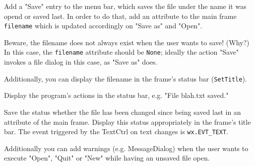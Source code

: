 \begin{aufgabe}
\begin{teilaufgabe}[Save]
Add a "Save" entry to the menu bar, which saves the file under the name it was opend or saved last. In order to do that, add an attribute to the main frame  \lstinline{filename} which is updated accordingly on "Save as" and "Open".

Beware, the filename does not always exist when the user wants to save! (Why?) In this case, the \lstinline{filename} attribute should be \lstinline{None}; ideally the action "Save" invokes a file dialog in this case, as "Save as" does.

Additionally, you can display the filename in the frame's status bar (\lstinline{SetTitle}).
\end{teilaufgabe}

\begin{teilaufgabe}
Display the program's actions in the status bar, e.g. "File blah.txt saved."
\end{teilaufgabe}

\begin{teilaufgabe}
Save the status whether the file has been changed since being saved last in an attribute of the main frame. Display this status appropriately in the frame's title bar. The event triggered by the TextCtrl on text changes is \lstinline{wx.EVT_TEXT}.

Additionally you can add warnings (e.g. MessageDialog) when the user wants to execute "Open", "Quit" or "New" while having an unsaved file open.
\end{teilaufgabe}

\end{aufgabe}

